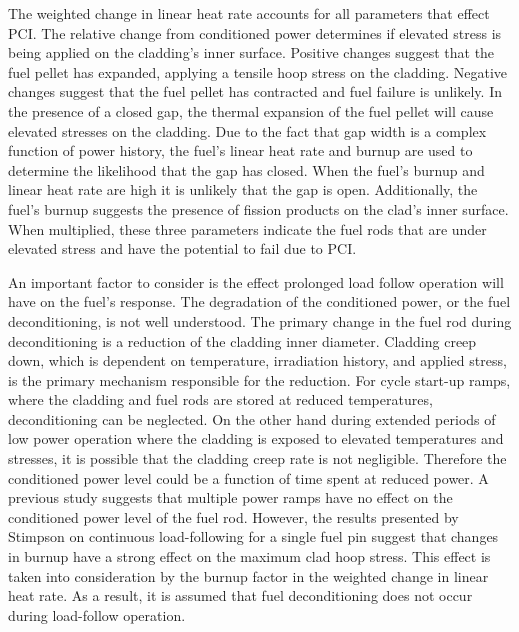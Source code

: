 \documentclass[edeposit,fullpage,11pt]{uiucthesis2009}
\begin{document}
The weighted change in linear heat rate accounts for all parameters that effect \gls{PCI}.
The relative change from conditioned power determines if elevated stress is being applied on the cladding's inner surface.
Positive changes suggest that the fuel pellet has expanded, applying a tensile hoop stress on the cladding.
Negative changes suggest that the fuel pellet has contracted and fuel failure is unlikely.
In the presence of a closed gap, the thermal expansion of the fuel pellet will cause elevated stresses on the cladding.
Due to the fact that gap width is a complex function of power history, the fuel's linear heat rate and burnup are used to determine the likelihood that the gap has closed.
When the fuel's burnup and linear heat rate are high it is unlikely that the gap is open.
Additionally, the fuel's burnup suggests the presence of fission products on the clad's inner surface.
When multiplied, these three parameters indicate the fuel rods that are under elevated stress and have the potential to fail due to \gls{PCI}.

An important factor to consider is the effect prolonged load follow operation will have on the fuel's response.
The degradation of the conditioned power, or the fuel deconditioning, is not well understood.
The primary change in the fuel rod during deconditioning is a reduction of the cladding inner diameter.
Cladding creep down, which is dependent on temperature, irradiation history, and applied stress, is the primary mechanism responsible for the reduction.  
For cycle start-up ramps, where the cladding and fuel rods are stored at reduced temperatures, deconditioning can be neglected. %
On the other hand during extended periods of low power operation where the cladding is exposed to elevated temperatures and stresses, it is possible that the cladding creep rate is not negligible.
Therefore the conditioned power level could be a function of time spent at reduced power.
A previous study \cite{galrtner_survey_1987} suggests that multiple power ramps have no effect on the conditioned power level of the fuel rod.  
However, the results presented by Stimpson \cite{stimpson_demonstration_2017} on continuous load-following for a single fuel pin suggest that changes in burnup have a strong effect on the maximum clad hoop stress.
This effect is taken into consideration by the burnup factor in the weighted change in linear heat rate.
As a result, it is assumed that fuel deconditioning does not occur during load-follow operation.


\end{document}

